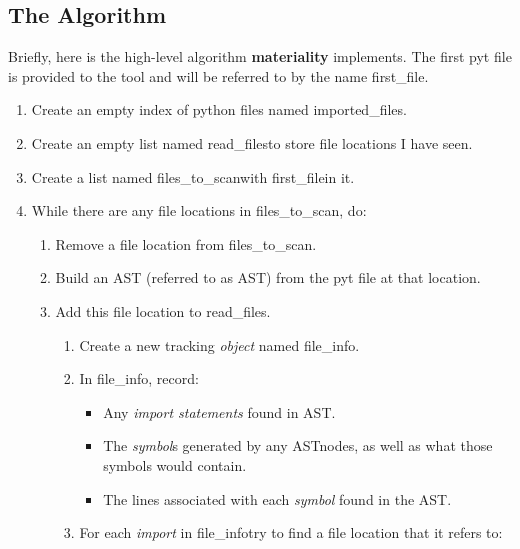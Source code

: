 \documentclass[a4paper,man,natbib,floatsintext]{apa6}
\begin{document}
  \subsection{The Algorithm}
  \singlespace %
  Briefly, here is the high-level algorithm \textbf{materiality} implements. The first \Gls{pyt} file is provided to the tool and will be referred to by the name \textlangle first\_file\textrangle.
  \begin{enumerate}
    \item Create an empty index of python files named \textlangle imported\_files\textrangle.
    \item Create an empty list named \textlangle read\_files\textrangle to store file locations I have seen.
    \item Create a list named \textlangle files\_to\_scan\textrangle with \textlangle first\_file\textrangle in it. 
    \item While there are any file locations in \textlangle files\_to\_scan\textrangle, do:
    \begin{enumerate}
      \item Remove a file location from \textlangle files\_to\_scan\textrangle.
      \item Build an AST (referred to as \textlangle AST\textrangle) from the \Gls{pyt} file at that location.
      \item Add this file location to \textlangle read\_files\textrangle.
      \begin{enumerate}
        \item Create a new tracking \textit{object} named \textlangle file\_info\textrangle.
        \item In \textlangle file\_info\textrangle, record:
        \begin{itemize}
          \item Any \textit{import statements} found in \textlangle AST\textrangle.
          \item The \textit{symbol}s generated by any \textlangle AST\textrangle nodes, as well as what those symbols would contain.
          \item The lines associated with each \textit{symbol} found in the \textlangle AST\textrangle.
        \end{itemize}
        \item For each \textit{import} in \textlangle file\_info\textrangle try to find a file location that it refers to:
        \begin{enumerate}

\end{enumerate}
\end{enumerate}
\end{enumerate}
\end{enumerate}
\end{document}
